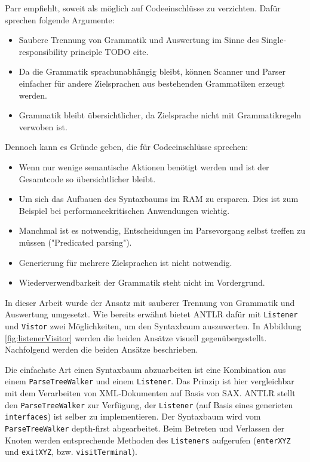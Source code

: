 Parr empfiehlt, soweit als möglich auf Codeeinschlüsse zu verzichten. Dafür sprechen folgende Argumente:
\begin{itemize}
    \item Saubere Trennung von Grammatik und Auswertung im Sinne des Single-res\-pon\-si\-bi\-li\-ty principle TODO cite.
    \item Da die Grammatik sprachunabhängig bleibt, können Scanner und Parser einfacher für andere Zielsprachen aus bestehenden Grammatiken erzeugt werden.
    \item Grammatik bleibt übersichtlicher, da Zielsprache nicht mit Grammatikregeln verwoben ist.
\end{itemize}

Dennoch kann es Gründe geben, die für Codeeinschlüsse sprechen:
\begin{itemize}
    \item Wenn nur wenige semantische Aktionen benötigt werden und ist der Gesamtcode so übersichtlicher bleibt.
    \item Um sich das Aufbauen des Syntaxbaums im RAM zu ersparen. Dies ist zum Beispiel bei performancekritischen Anwendungen wichtig.
    \item Manchmal ist es notwendig, Entscheidungen im Parsevorgang selbst treffen zu müssen ("Predicated parsing").
    \item Generierung für mehrere Zielsprachen ist nicht notwendig.
    \item Wiederverwendbarkeit der Grammatik steht nicht im Vordergrund.
\end{itemize}

In dieser Arbeit wurde der Ansatz mit sauberer Trennung von Grammatik und Auswertung umgesetzt. Wie bereits erwähnt bietet ANTLR dafür mit \lstinline{Listener} und \lstinline{Vistor} zwei Möglichkeiten, um den Syntaxbaum auszuwerten. In Abbildung \ref{fig:listenerVisitor} werden die beiden Ansätze visuell gegenübergestellt. Nachfolgend werden die beiden Ansätze beschrieben.

Die einfachste Art einen Syntaxbaum abzuarbeiten ist eine Kombination aus einem \lstinline{ParseTreeWalker} und einem \lstinline{Listener}. Das Prinzip ist hier vergleichbar mit dem Verarbeiten von XML-Dokumenten auf Basis von SAX. ANTLR stellt den \lstinline{ParseTreeWalker} zur Verfügung, der \lstinline{Listener} (auf Basis eines generieten \lstinline{interfaces}) ist selber zu implementieren. Der Syntaxbaum wird vom \lstinline{ParseTreeWalker} depth-first abgearbeitet. Beim Betreten und Verlassen der Knoten werden entsprechende Methoden des \lstinline{Listeners} aufgerufen (\lstinline{enterXYZ} und \lstinline{exitXYZ}, bzw. \lstinline{visitTerminal}).

